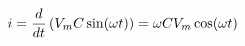 \documentclass[preview]{standalone}
\begin{document}
\begin{align*}
i = {d \over dt} \left( V_m C \sin(\omega t) \right) = \omega C V_m \cos(\omega t)
\end{align*}
\end{document}
